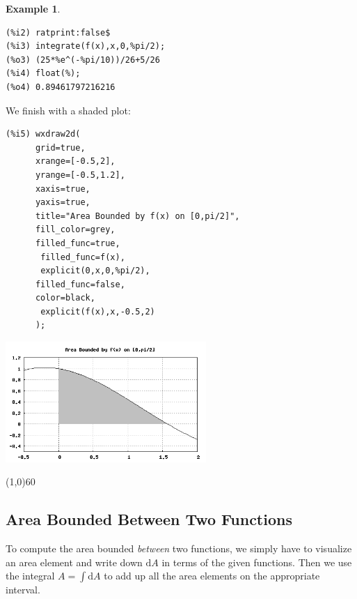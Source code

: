 \documentclass[10.5pt,twoside]{report}
\theoremstyle{definition}
\newtheorem{exmp}{Example}[section]
\begin{document}
\begin{exmp}
\begin{verbatim}
(%i2) ratprint:false$
(%i3) integrate(f(x),x,0,%pi/2);
(%o3) (25*%e^(-%pi/10))/26+5/26
(%i4) float(%);
(%o4) 0.89461797216216
\end{verbatim}


We finish with a shaded plot:


\begin{verbatim}
(%i5) wxdraw2d(
      grid=true,
      xrange=[-0.5,2],
      yrange=[-0.5,1.2],
      xaxis=true,
      yaxis=true,
      title="Area Bounded by f(x) on [0,pi/2]",
      fill_color=grey,
      filled_func=true,
       filled_func=f(x),
       explicit(0,x,0,%pi/2),
      filled_func=false,
      color=black,
       explicit(f(x),x,-0.5,2)
      );
\end{verbatim}

\includegraphics[width=3in]{example_7_3_1_1_2}
\end{exmp}

\line(1,0){60}
\linethickness{0.5mm}



\subsection{Area Bounded Between Two Functions}


To compute the area bounded \textit{between} two functions, we simply have to visualize an area element and write down $\mathrm{d}A$ in terms of the given functions.  Then we use the integral $A=\displaystyle \int \mathrm{d}A$ to add up all the area elements on the appropriate interval.
\end{document}
